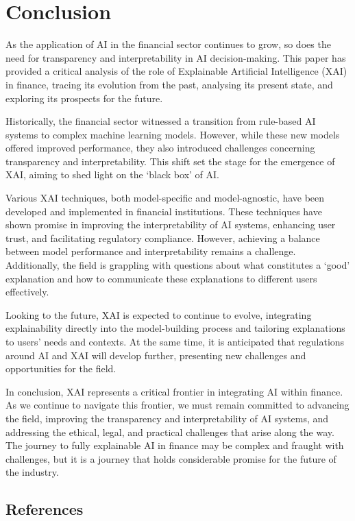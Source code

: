 \documentclass[
  letterpaper,
  DIV=11,
  numbers=noendperiod]{scrartcl}
\begin{document}
\hypertarget{conclusion}{%
\section{Conclusion}\label{conclusion}}

As the application of AI in the financial sector continues to grow, so
does the need for transparency and interpretability in AI
decision-making. This paper has provided a critical analysis of the role
of Explainable Artificial Intelligence (XAI) in finance, tracing its
evolution from the past, analysing its present state, and exploring its
prospects for the future.

Historically, the financial sector witnessed a transition from
rule-based AI systems to complex machine learning models. However, while
these new models offered improved performance, they also introduced
challenges concerning transparency and interpretability. This shift set
the stage for the emergence of XAI, aiming to shed light on the `black
box' of AI.

Various XAI techniques, both model-specific and model-agnostic, have
been developed and implemented in financial institutions. These
techniques have shown promise in improving the interpretability of AI
systems, enhancing user trust, and facilitating regulatory compliance.
However, achieving a balance between model performance and
interpretability remains a challenge. Additionally, the field is
grappling with questions about what constitutes a `good' explanation and
how to communicate these explanations to different users effectively.

Looking to the future, XAI is expected to continue to evolve,
integrating explainability directly into the model-building process and
tailoring explanations to users' needs and contexts. At the same time,
it is anticipated that regulations around AI and XAI will develop
further, presenting new challenges and opportunities for the field.

In conclusion, XAI represents a critical frontier in integrating AI
within finance. As we continue to navigate this frontier, we must remain
committed to advancing the field, improving the transparency and
interpretability of AI systems, and addressing the ethical, legal, and
practical challenges that arise along the way. The journey to fully
explainable AI in finance may be complex and fraught with challenges,
but it is a journey that holds considerable promise for the future of
the industry.

\hypertarget{references}{%
\subsection*{References}\label{references}}
\end{document}
